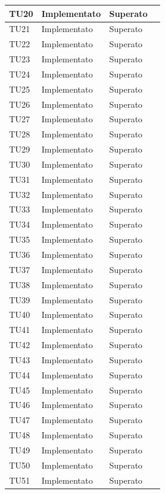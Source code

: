 \begin{longtable}{|>{\centering\arraybackslash}m{1.6cm}|>{\centering\arraybackslash}m{6.41cm}|>{\centering\arraybackslash}m{3.1cm}| c |}
	TU20 & Implementato & Superato \\ \hline
	TU21 & Implementato & Superato \\ \hline
	TU22 & Implementato & Superato \\ \hline
	TU23 & Implementato & Superato \\ \hline
	TU24 & Implementato & Superato \\ \hline
	TU25 & Implementato & Superato \\ \hline		
	TU26 & Implementato & Superato \\ \hline
	TU27 & Implementato & Superato  \\ \hline
	TU28 & Implementato & Superato  \\ \hline
	TU29 & Implementato & Superato  \\ \hline
	TU30 & Implementato & Superato  \\ \hline
	TU31 & Implementato & Superato  \\ \hline
	TU32 & Implementato & Superato  \\ \hline
	TU33 & Implementato & Superato  \\ \hline
	TU34 & Implementato & Superato  \\ \hline
	TU35 & Implementato & Superato \\ \hline
	TU36 & Implementato & Superato \\ \hline
	TU37 & Implementato & Superato  \\ \hline
	TU38 & Implementato & Superato  \\ \hline
	TU39 & Implementato & Superato  \\ \hline
	TU40 & Implementato & Superato  \\ \hline
	TU41 & Implementato & Superato  \\ \hline
	TU42 & Implementato & Superato  \\ \hline
	TU43 & Implementato & Superato  \\ \hline
	TU44 & Implementato & Superato  \\ \hline
	TU45 & Implementato & Superato  \\ \hline
	TU46 & Implementato & Superato  \\ \hline
	TU47 & Implementato & Superato  \\ \hline
	TU48 & Implementato & Superato  \\ \hline
	TU49 & Implementato & Superato  \\ \hline
	TU50 & Implementato & Superato  \\ \hline
	TU51 & Implementato & Superato  \\ \hline

\end{longtable}
